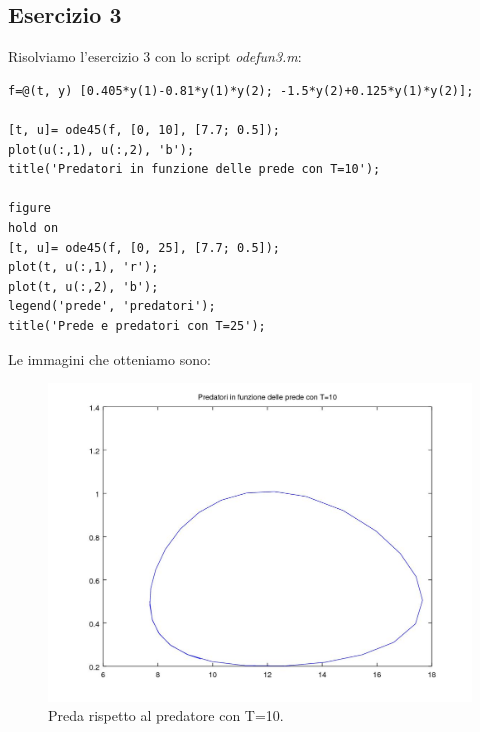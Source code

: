 \documentclass[11pt,a4paper,twoside,openright,titlepage,
headinclude,footinclude,BCOR5mm,
numbers=noenddot,cleardoublepage=empty,
tablecaptionabove]{scrbook}
\begin{document}
\subsection{Esercizio 3}
Risolviamo l'esercizio 3 con lo script \emph{odefun3.m}:
\begin{lstlisting}[frame = trBL]
f=@(t, y) [0.405*y(1)-0.81*y(1)*y(2); -1.5*y(2)+0.125*y(1)*y(2)];

[t, u]= ode45(f, [0, 10], [7.7; 0.5]);
plot(u(:,1), u(:,2), 'b');
title('Predatori in funzione delle prede con T=10');

figure
hold on
[t, u]= ode45(f, [0, 25], [7.7; 0.5]);
plot(t, u(:,1), 'r');
plot(t, u(:,2), 'b');
legend('prede', 'predatori');
title('Prede e predatori con T=25');
\end{lstlisting}
Le immagini che otteniamo sono:
\begin{center}
\begin{figure}[h!]
\includegraphics[width=\textwidth]{figs/predatori_prede_10.jpg}
\caption{Preda rispetto al predatore con T=10.}
\end{figure}
\end{center}
\end{document}
